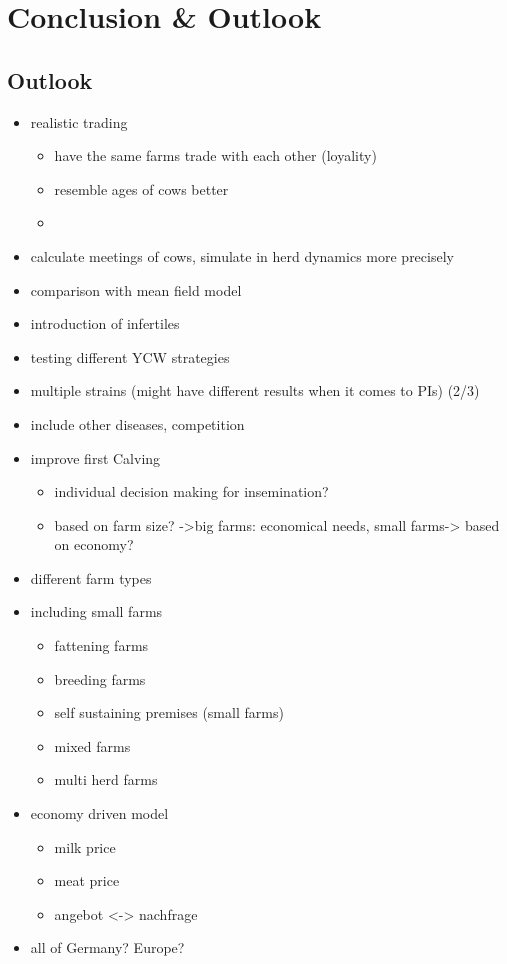 \chapter{Conclusion \& Outlook}
\section{Outlook}
\begin{itemize}
\item realistic trading
\begin{itemize}
\item have the same farms trade with each other (loyality)
\item resemble ages of cows better
\item 
\end{itemize}
\item calculate meetings of cows, simulate in herd dynamics more precisely
\item comparison with mean field model
\item introduction of infertiles
\item testing different YCW strategies
\item multiple strains (might have different results when it comes to PIs) (2/3)
\item include other diseases, competition
\item improve first Calving 
\begin{itemize}
\item individual decision making for insemination? 
\item based on farm size? ->big farms: economical needs, small farms-> based on economy?
\end{itemize}
\item different farm types
\item including small farms
\begin{itemize}
\item fattening farms
\item breeding farms
\item self sustaining premises (small farms)
\item mixed farms
\item multi herd farms
\end{itemize}

\item economy driven model
\begin{itemize}
\item milk price
\item meat price
\item angebot <-> nachfrage
\end{itemize}
\item all of Germany? Europe?
\end{itemize}

